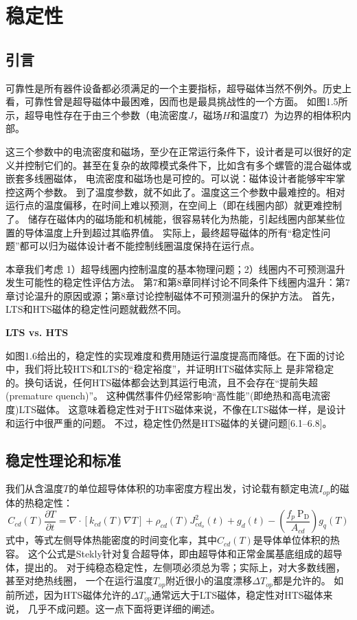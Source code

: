 \chapter{稳定性}
\section{引言}
可靠性是所有器件设备都必须满足的一个主要指标，超导磁体当然不例外。历史上看，可靠性曾是超导磁体中最困难，因而也是最具挑战性的一个方面。
如图1.5所示，超导电性存在于由三个参数（电流密度$J$，磁场$H$和温度$T$）为边界的相体积内部。

这三个参数中的电流密度和磁场，至少在正常运行条件下，设计者是可以很好的定义并控制它们的。甚至在复杂的故障模式条件下，比如含有多个螺管的混合磁体或嵌套多线圈磁体，
电流密度和磁场也是可控的。可以说：磁体设计者能够牢牢掌控这两个参数。
到了温度参数，就不如此了。温度这三个参数中最难控的。相对运行点的温度偏移，在时间上难以预测，在空间上（即在线圈内部）就更难控制了。
储存在磁体内的磁场能和机械能，很容易转化为热能，引起线圈内部某些位置的导体温度上升到超过其临界值。
实际上，最终超导磁体的所有“稳定性问题”都可以归为磁体设计者不能控制线圈温度保持在运行点。

本章我们考虑 1）超导线圈内控制温度的基本物理问题；2）线圈内不可预测温升发生可能性的稳定性评估方法。
第7和第8章同样讨论不同条件下线圈内温升：第7章讨论温升的原因或源；第8章讨论控制磁体不可预测温升的保护方法。
首先，LTS和HTS磁体的稳定性问题就截然不同。

\textbf{LTS vs. HTS}

如图1.6给出的，稳定性的实现难度和费用随运行温度提高而降低。在下面的讨论中，我们将比较HTS和LTS的“稳定裕度”，并证明HTS磁体实际上
是非常稳定的。换句话说，任何HTS磁体都会达到其运行电流，且不会存在“提前失超(premature quench)”。
这种偶然事件仍经常影响“高性能”(即绝热和高电流密度)LTS磁体。
这意味着稳定性对于HTS磁体来说，不像在LTS磁体一样，是设计和运行中很严重的问题。
不过，稳定性仍然是HTS磁体的关键问题[6.1–6.8]。

\section{稳定性理论和标准}
我们从含温度$T$的单位超导体体积的功率密度方程出发，讨论载有额定电流$I_{op}$的磁体的热稳定性：
\begin{equation}
C_{cd}(T)\frac{\partial T}{\partial t}=\nabla ·[k_{cd}(T)\nabla T]+\rho_{cd}(T)J_{cd_o}^2(t)+g_d(t)-(\frac{f_p\ \mathrm{P_D}}{A_{cd}})g_q(T)
\end{equation}
式中，等式左侧导体热能密度的时间变化率，其中$C_{cd}(T)$是导体单位体积的热容。
这个公式是Stekly针对复合超导体，即由超导体和正常金属基底组成的超导体，提出的。
对于纯稳态稳定性，左侧项必须总为零；实际上，对大多数线圈，甚至对绝热线圈，
一个在运行温度$T_{op}$附近很小的温度漂移$\Delta T_{op}$都是允许的。
如前所述，因为HTS磁体允许的$\Delta T_{op}$通常远大于LTS磁体，稳定性对HTS磁体来说，
几乎不成问题。这一点下面将更详细的阐述。


